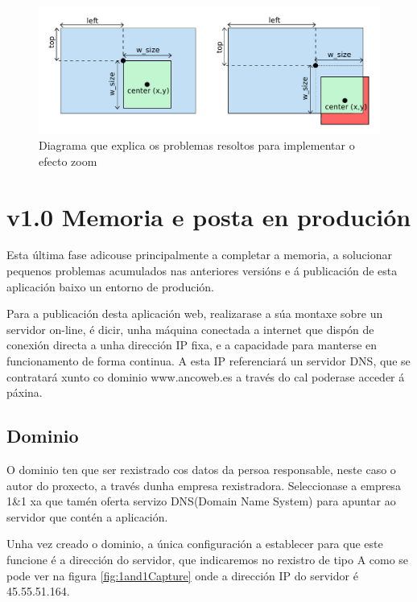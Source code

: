         \begin{figure}[htp]
        \begin{center}
            \includegraphics[scale=0.75]{figures/centerToLeftTop.pdf}
            \caption{Diagrama que explica os problemas resoltos para implementar o efecto zoom}
        \label{fig:centerToLeftTop}
        \end{center}
        \end{figure}

\section{v1.0 Memoria e posta en produción}
    Esta última fase adicouse principalmente a completar a memoria, a solucionar pequenos problemas
    acumulados nas anteriores versións e á publicación de esta aplicación baixo un entorno de 
    produción.
    
    Para a publicación desta aplicación web, realizarase a súa montaxe sobre un servidor on-line,
    é dicir, unha máquina conectada a internet que dispón de conexión directa a unha dirección IP
    fixa, e a capacidade para manterse en funcionamento de forma continua. A esta IP referenciará un
    servidor DNS, que se contratará xunto co dominio www.ancoweb.es a través do cal poderase acceder
    á páxina.

    \subsection{Dominio}
        O dominio ten que ser rexistrado cos datos da persoa responsable, neste caso o autor do 
        proxecto, a través dunha empresa rexistradora. Seleccionase a empresa 1\&1
        \cite{1and1-website} xa que tamén oferta servizo DNS(Domain Name System) para apuntar ao 
        servidor que contén a aplicación.
        
        Unha vez creado o dominio, a única configuración a establecer para que este funcione 
        é a dirección do servidor, que indicaremos no rexistro de tipo A como se pode
        ver na figura \ref{fig:1and1Capture} onde a dirección IP do servidor é 45.55.51.164.

